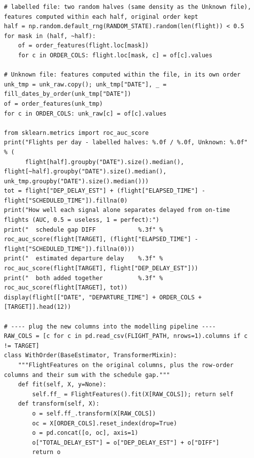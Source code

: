 \documentclass[12pt,a4paper]{article}
\begin{document}
\begin{lstlisting}[style=code]
# labelled file: two random halves (same density as the Unknown file), features computed within each half, original order kept
half = np.random.default_rng(RANDOM_STATE).random(len(flight)) < 0.5
for mask in (half, ~half):
    of = order_features(flight.loc[mask])
    for c in ORDER_COLS: flight.loc[mask, c] = of[c].values

# Unknown file: features computed within the file, in its own order
unk_tmp = unk_raw.copy(); unk_tmp["DATE"], _ = fill_dates_by_order(unk_tmp["DATE"])
of = order_features(unk_tmp)
for c in ORDER_COLS: unk_raw[c] = of[c].values

from sklearn.metrics import roc_auc_score
print("Flights per day - labelled halves: %.0f / %.0f, Unknown: %.0f" % (
      flight[half].groupby("DATE").size().median(), flight[~half].groupby("DATE").size().median(), unk_tmp.groupby("DATE").size().median()))
tot = flight["DEP_DELAY_EST"] + (flight["ELAPSED_TIME"] - flight["SCHEDULED_TIME"]).fillna(0)
print("How well each signal alone separates delayed from on-time flights (AUC, 0.5 = useless, 1 = perfect):")
print("  schedule gap DIFF            %.3f" % roc_auc_score(flight[TARGET], (flight["ELAPSED_TIME"] - flight["SCHEDULED_TIME"]).fillna(0)))
print("  estimated departure delay    %.3f" % roc_auc_score(flight[TARGET], flight["DEP_DELAY_EST"]))
print("  both added together          %.3f" % roc_auc_score(flight[TARGET], tot))
display(flight[["DATE", "DEPARTURE_TIME"] + ORDER_COLS + [TARGET]].head(12))

# ---- plug the new columns into the modelling pipeline ----
RAW_COLS = [c for c in pd.read_csv(FLIGHT_PATH, nrows=1).columns if c != TARGET]
class WithOrder(BaseEstimator, TransformerMixin):
    """FlightFeatures on the original columns, plus the row-order columns and their sum with the schedule gap."""
    def fit(self, X, y=None):
        self.ff_ = FlightFeatures().fit(X[RAW_COLS]); return self
    def transform(self, X):
        o = self.ff_.transform(X[RAW_COLS])
        oc = X[ORDER_COLS].reset_index(drop=True)
        o = pd.concat([o, oc], axis=1)
        o["TOTAL_DELAY_EST"] = o["DEP_DELAY_EST"] + o["DIFF"]
        return o


\end{lstlisting}
\end{document}
